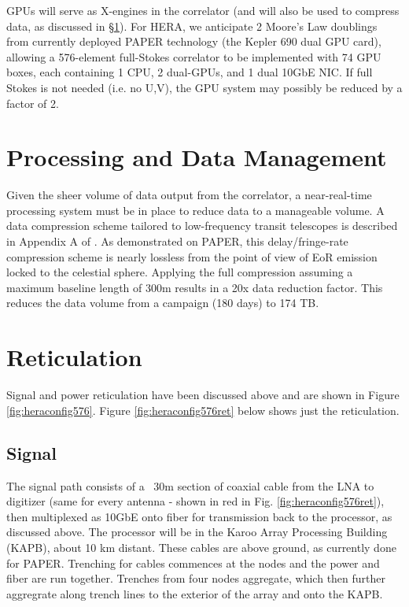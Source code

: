 \documentclass[11pt]{article}
\begin{document}
GPUs will serve as X-engines in the correlator (and will also be used to compress data, as discussed 
in \S\ref{sec:procData}). For HERA, we anticipate 2 Moore's Law doublings from currently deployed PAPER
technology (the Kepler 690 dual GPU card), allowing a 576-element full-Stokes correlator to be implemented with
74 GPU boxes, each containing 1 CPU, 2 dual-GPUs, and 1 dual 10GbE NIC.
If full Stokes is not needed (i.e. no U,V), the GPU system may possibly be reduced by a factor of 2.


\section{Processing and Data Management}
\label{sec:procData}
Given the sheer volume of data output from the correlator, a near-real-time processing system must
be in place to reduce data to a manageable volume.  A data compression scheme tailored to low-frequency
transit telescopes is described in Appendix A of \citet{parsons_et_al2013}.
As demonstrated on PAPER, this delay/fringe-rate compression scheme is nearly lossless from
the point of view of EoR emission locked to the celestial sphere.  Applying the full compression assuming
a maximum baseline length of 300m results in a 20x data reduction factor.  This reduces the data volume
from a campaign (180 days) to 174 TB.

\section{Reticulation}
Signal and power reticulation have been discussed above and are shown in Figure \ref{fig:heraconfig576}.  Figure \ref{fig:heraconfig576ret} below shows just the reticulation.

\subsection{Signal}
The signal path consists of a ~30m section of coaxial cable from the LNA to digitizer (same for every antenna - shown in red in Fig. \ref{fig:heraconfig576ret}), then multiplexed as 10GbE onto fiber for transmission back to the processor, as discussed above.  The processor will be in the Karoo Array Processing Building (KAPB), about 10 km distant. These cables are above ground, as currently done for PAPER.  Trenching for cables commences at the nodes and the power and fiber are run together.  Trenches from four nodes aggregate, which then further aggregrate along trench lines to the exterior of the array and onto the KAPB.
\end{document}
